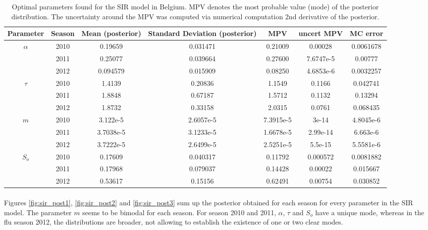\documentclass[11pt, a4paper]{article}
\begin{document}
\begin{table}
\centering
\begin{tabular}{| c | c | c | c | c | c | c |}
    \hline
    Parameter & Season & Mean (posterior) &  Standard Deviation (posterior) & MPV & uncert MPV & MC error\\ \hline
    \multirow{3}{*}{$\alpha$} & 2010 & 0.19659 & 0.031471 &0.21009 & 0.00028& 0.0061678 \\
    & 2011 & 0.25077 & 0.039664 & 0.27600 & 7.6747e-5 & 0.00777 \\
    & 2012 & 0.094579 & 0.015909 & 0.08250 & 4.6853e-6 & 0.0032257 \\ \hline
    \multirow{3}{*}{$\tau$} & 2010 & 1.4139 & 0.20836 & 1.1549 & 0.1166 & 0.042741 \\ 
    & 2011 & 1.8848 & 0.67187 & 1.5712 & 0.1132 & 0.13294 \\ 
    & 2012 & 1.8732 & 0.33158 & 2.0315 & 0.0761 & 0.068435 \\ \hline
    \multirow{3}{*}{$m$} & 2010 & 3.122e-5 & 2.6057e-5 &7.3915e-5 & 3e-14 & 4.8045e-6 \\ 
    & 2011 & 3.7038e-5 & 3.1233e-5 &1.6678e-5 & 2.99e-14 & 6.663e-6 \\ 
    & 2012 & 3.7222e-5 & 2.6499e-5 & 2.5251e-5 & 5.5e-15 & 5.5581e-6 \\ \hline
    \multirow{3}{*}{$S_o$} & 2010 & 0.17609 & 0.040317 &0.11792 & 0.000572 & 0.0081882 \\
    & 2011 & 0.17968 & 0.079037 & 0.14428 & 0.00022 & 0.015667 \\ 
    & 2012 & 0.53617 & 0.15156 & 0.62491 & 0.00754 & 0.030852 \\ \hline
    \end{tabular}
    \caption{Optimal parameters found for the SIR model in Belgium. MPV denotes the most probable value (mode) of the posterior distribution. The uncertainty around the MPV was computed via numerical computation 2nd derivative of the posterior.}
    \label{tab:sirDRAM}
\end{table}

\paragraph{}
Figures \ref{fig:sir_post1}, \ref{fig:sir_post2} and \ref{fig:sir_post3} sum up the posterior obtained for each season for every parameter in the SIR model. The parameter $m$ seems to be bimodal for each season. For season 2010 and 2011, $\alpha$, $\tau$ and $S_o$ have a unique mode, whereas in the flu season 2012, the distributions are broader, not allowing to establish the existence of one or two clear modes.
\end{document}
